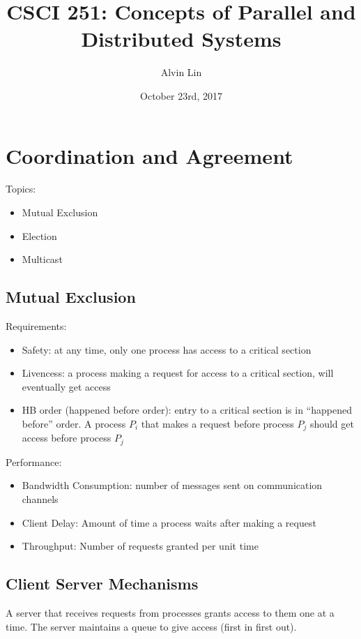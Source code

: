 \documentclass{math}
\title{CSCI 251: Concepts of Parallel and Distributed Systems}
\author{Alvin Lin}
\date{October 23rd, 2017}
\begin{document}
\maketitle

\section*{Coordination and Agreement}
Topics:
\begin{itemize}
  \item Mutual Exclusion
  \item Election
  \item Multicast
\end{itemize}

\subsection*{Mutual Exclusion}
Requirements:
\begin{itemize}
  \item Safety: at any time, only one process has access to a critical section
  \item Livencess: a process making a request for access to a critical section,
  will eventually get access
  \item HB order (happened before order): entry to a critical section is in
  ``happened before'' order. A process \( P_i \) that makes a request before
  process \( P_j \) should get access before process \( P_j \)
\end{itemize}
Performance:
\begin{itemize}
  \item Bandwidth Consumption: number of messages sent on communication channels
  \item Client Delay: Amount of time a process waits after making a request
  \item Throughput: Number of requests granted per unit time
\end{itemize}

\subsection*{Client Server Mechanisms}
A server that receives requests from processes grants access to them one at a
time. The server maintains a queue to give access (first in first out).
\end{document}
